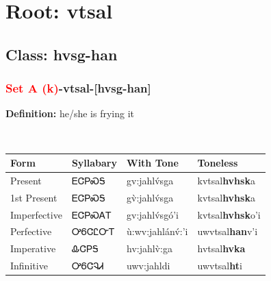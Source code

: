 \needspace{4in}
\section*{Root: vtsal}
\nopagebreak
{}
\needspace{3in}
\subsection*{Class: hvsg-han}
\nopagebreak
\needspace{2in}
\subsubsection*{\textcolor{Red}{Set A (k)}{-}\textbf{vtsal}{-}[hvsg-han]}
\nopagebreak
\textbf{Definition: } he/she is frying it
\\[0.5em]
\begin{tabularx}{\textwidth}{l X X X}%
\toprule%
\textbf{Form}&\textbf{Syllabary}&\textbf{With Tone}&\textbf{Toneless}\\%
\midrule%
Present&ᎬᏣᏢᏍᎦ&gv:jahlv́sga&kvtsal\textbf{hvhsk}a\\%
1st Present&ᎬᏣᏢᏍᎦ&gv̀:jahlv́sga&kvtsal\textbf{hvhsk}a\\%
Imperfective&ᎬᏣᏢᏍᎪᎢ&gv:jahlv́sgó’i&kvtsal\textbf{hvhsk}o'i\\%
Perfective&ᎤᏮᏣᏝᏅᎢ&ù:wv:jahlánv́:’i&uwvtsal\textbf{han}v'i\\%
Imperative&ᎲᏣᏢᎦ&hv:jahlv̀:ga&hvtsal\textbf{hvka}\\%
Infinitive&ᎤᏮᏣᎸᏗ&uwv:jahldi&uwvtsal\textbf{ht}i\\%
\bottomrule%
\end{tabularx}
\\[1em]